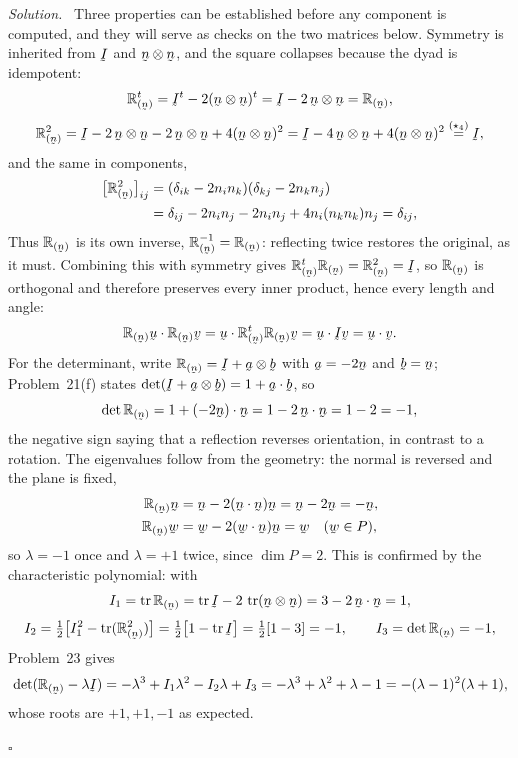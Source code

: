 \documentclass[17pt,a4paper]{extreport}
\DeclareRobustCommand{\vek}[1]{\underaccent{\tilde}{#1}}
\newcommand{\Refl}[1]{\mathbb{R}_{(#1)}}
\newcommand{\tr}{\operatorname{tr}}
\newcommand{\I}{\vek{I}}
\newcommand{\ba}{\vek{a}}
\newcommand{\bb}{\vek{b}}
\newcommand{\bu}{\vek{u}}
\newcommand{\bv}{\vek{v}}
\newcommand{\bw}{\vek{w}}
\newcommand{\bn}{\vek{n}}
\newcommand{\dd}{\delta}
\newcommand{\ip}[2]{#1\cdot#2}
\theoremstyle{scplain}
\theoremstyle{scdefn}
\theoremstyle{scplain}
\newenvironment{solution}
 {\par\smallskip\noindent\textit{Solution.}\ }
 {\hfill$\square$\par\medskip}
\begin{document}
\begin{solution}
Three properties can be established before any component is computed, and
they will serve as checks on the two matrices below. Symmetry is inherited
from $\I$ and $\bn\otimes\bn$, and the square collapses because the dyad is
idempotent:
\[
   \Refl{\bn}^{t}=\I^{t}-2(\bn\otimes\bn)^{t}=\I-2\,\bn\otimes\bn
   =\Refl{\bn},
\]
\[
   \Refl{\bn}^{2}=\I-2\,\bn\otimes\bn-2\,\bn\otimes\bn
   +4(\bn\otimes\bn)^{2}
   =\I-4\,\bn\otimes\bn+4(\bn\otimes\bn)^{2}
   \overset{(\star_4)}{=}\I,
\]
and the same in components,
\[
\begin{aligned}
   \big[\Refl{\bn}^{2}\big]_{ij}&=(\dd_{ik}-2n_in_k)(\dd_{kj}-2n_kn_j)\\
   &=\dd_{ij}-2n_in_j-2n_in_j+4n_i(n_kn_k)n_j=\dd_{ij},
\end{aligned}
\]
Thus $\Refl{\bn}$ is its own inverse, $\Refl{\bn}^{-1}=\Refl{\bn}$:
reflecting twice restores the original, as it must. Combining this with
symmetry gives $\Refl{\bn}^{t}\Refl{\bn}=\Refl{\bn}^{2}=\I$, so
$\Refl{\bn}$ is orthogonal and therefore preserves every inner product,
hence every length and angle:
\[
   \ip{\Refl{\bn}\bu}{\Refl{\bn}\bv}
   =\ip\bu{\Refl{\bn}^{t}\Refl{\bn}\bv}=\ip\bu{\I\bv}=\ip\bu\bv .
\]
For the determinant, write $\Refl{\bn}=\I+\ba\otimes\bb$ with $\ba=-2\bn$
and $\bb=\bn$; Problem~21(f) states $\det(\I+\ba\otimes\bb)=1+\ip\ba\bb$, so
\[
   \det\Refl{\bn}=1+\ip{(-2\bn)}{\bn}=1-2\,\ip\bn\bn=1-2=-1 ,
\]
the negative sign saying that a reflection reverses orientation, in contrast
to a rotation. The eigenvalues follow from the geometry: the normal is
reversed and the plane is fixed,
\[
\begin{aligned}
   \Refl{\bn}\bn&=\bn-2(\ip\bn\bn)\bn=\bn-2\bn=-\bn,\\
   \Refl{\bn}\bw&=\bw-2(\ip\bw\bn)\bn=\bw \quad (\bw\in P),
\end{aligned}
\]
so $\lambda=-1$ once and $\lambda=+1$ twice, since $\dim P=2$. This is
confirmed by the characteristic polynomial: with
\[
   I_1=\tr\Refl{\bn}=\tr\I-2\,\tr(\bn\otimes\bn)=3-2\,\ip\bn\bn=1,
\]
\[
   I_2=\tfrac12\big[I_1^{2}-\tr(\Refl{\bn}^{2})\big]
   =\tfrac12\big[1-\tr\I\big]=\tfrac12[1-3]=-1,
   \qquad I_3=\det\Refl{\bn}=-1,
\]
Problem~23 gives
\[
   \det(\Refl{\bn}-\lambda\I)=-\lambda^{3}+I_1\lambda^{2}-I_2\lambda+I_3
   =-\lambda^{3}+\lambda^{2}+\lambda-1
   =-(\lambda-1)^{2}(\lambda+1),
\]
whose roots are $+1,+1,-1$ as expected.


\end{solution}
\end{document}
